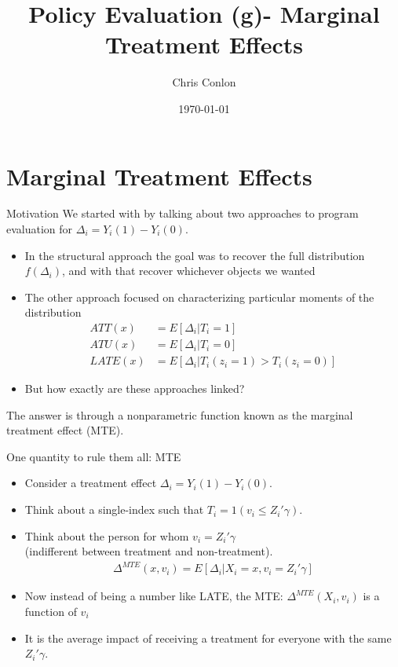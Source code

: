 \documentclass[xcolor=pdftex,dvipsnames,table,mathserif,aspectratio=169]{beamer}
\begin{document}
\title{Policy Evaluation (g)- Marginal Treatment Effects}
\author{Chris Conlon}
\date{\today}

\maketitle
\section{Marginal Treatment Effects}


\begin{frame}{Motivation}
We started with by talking about two approaches to program evaluation for $\Delta_i = Y_i(1) - Y_i(0)$.
\begin{itemize}
\item In the \alert{structural approach} the goal was to recover the full distribution $f(\Delta_i)$, and with that recover whichever objects we wanted
\item The other approach focused on characterizing particular moments of the distribution
\begin{align*}
ATT(x) &= E[ \Delta_i | T_{i}=1]\\
ATU(x) &= E[ \Delta_i | T_{i}=0]\\
LATE(x) &= E[ \Delta_i | T_{i}(z_i=1) > T_{i}(z_i = 0)]
\end{align*}

\item But how exactly are these approaches linked?
\end{itemize}
The answer is through a \alert{nonparametric function} known as the \alert{marginal treatment effect} (MTE).
\end{frame}

\begin{frame}{One quantity to rule them all: MTE}
\begin{itemize}
\item Consider a treatment effect $\Delta_i = Y_{i}(1) - Y_{i}(0)$.
\item Think about a single-index such that $T_i = 1(v_i \leq Z_i' \gamma)$.
\item Think about the person for whom $v_i = Z_i'\gamma$\\
 (indifferent between treatment and non-treatment).
\begin{eqnarray*}
\Delta^{MTE}(x, v_i) = E[\Delta_i | X_i=x, v_i = Z_i'\gamma] 
\end{eqnarray*}
\item Now instead of being \alert{a number} like LATE, the MTE: $\Delta^{MTE}(X_i, v_i)$ is a \alert{function} of $v_i$
\item It is the average impact of receiving a treatment for everyone with the same $Z_i' \gamma$.
\end{itemize}
\end{frame}
\end{document}
